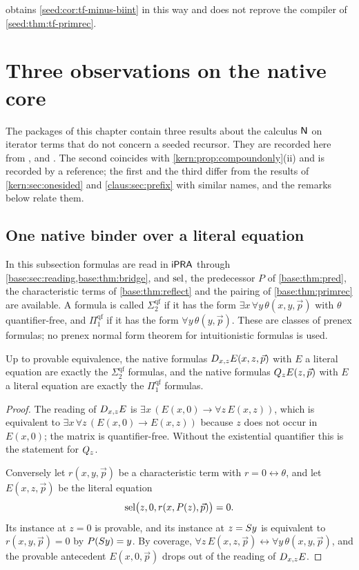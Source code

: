  obtains \cref{seed:cor:tf-minus-biint} in this
way and does not reprove the compiler of \cref{seed:thm:tf-primrec}.

\section{Three observations on the native core}
\label{seed:sec:core}

The packages of this chapter contain three results about the calculus
$\mathsf{N}$ on iterator terms that do not concern a seeded recursor. They are
recorded here from ,  and
. The second coincides with
\cref{kern:prop:compoundonly}(ii) and is recorded by a reference; the first
and the third differ from the results of \cref{kern:sec:onesided} and
\cref{claus:sec:prefix} with similar names, and the remarks below relate
them.

\subsection{One native binder over a literal equation}

In this subsection formulas are read in $\mathsf{iPRA}$ through
\cref{base:sec:reading,base:thm:bridge}, and $\operatorname{sel}$, the predecessor $P$ of
\cref{base:thm:pred}, the characteristic terms of \cref{base:thm:reflect}
and the pairing of \cref{base:thm:primrec} are available. A formula is
called $\Sigma_2^{\mathrm{qf}}$ if it has the form
$\exists x\,\forall y\,\theta(x,y,\vec p)$ with $\theta$ quantifier-free,
and $\Pi_1^{\mathrm{qf}}$ if it has the form $\forall y\,\theta(y,\vec p)$.
These are classes of prenex formulas; no prenex normal form theorem for
intuitionistic formulas is used.

\begin{proposition}\label{seed:prop:onebinder}
Up to provable equivalence, the native formulas
$D_{x,z}E(x,z,\vec p)$ with $E$ a literal equation are exactly the
$\Sigma_2^{\mathrm{qf}}$ formulas, and the native formulas
$Q_{z}E(z,\vec p)$ with $E$ a literal equation are exactly the
$\Pi_1^{\mathrm{qf}}$ formulas.
\end{proposition}

\begin{proof}
The reading of $D_{x,z}E$ is
$\exists x\,(E(x,0)\to\forall z\,E(x,z))$, which is equivalent to
$\exists x\,\forall z\,(E(x,0)\to E(x,z))$ because $z$ does not occur in
$E(x,0)$; the matrix is quantifier-free. Without the existential quantifier
this is the statement for $Q_{z}$.

Conversely let $r(x,y,\vec p)$ be a characteristic term with
$r=0\leftrightarrow\theta$, and let $E(x,z,\vec p)$ be the literal equation
\[
 \operatorname{sel}\bigl(z,0,r(x,P(z),\vec p)\bigr)=0 .
\]
Its instance at $z=0$ is provable, and its instance at $z=S y$ is
equivalent to $r(x,y,\vec p)=0$ by $P(S y)=y$. By coverage,
$\forall z\,E(x,z,\vec p)\leftrightarrow\forall y\,\theta(x,y,\vec p)$, and
the provable antecedent $E(x,0,\vec p)$ drops out of the reading of
$D_{x,z}E$.
\end{proof}

